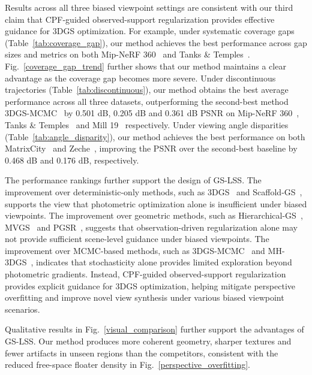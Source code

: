 \documentclass[lettersize,journal]{IEEEtran}
\begin{document}
Results across all three biased viewpoint settings are consistent with our third claim that CPF-guided observed-support regularization provides effective guidance for 3DGS optimization.
For example, under systematic coverage gaps (Table~\ref{tab:coverage_gap}), our method achieves the best performance across gap sizes and metrics on both Mip-NeRF 360~\cite{mipnerf360} and Tanks \& Temples~\cite{tankstemples}.
Fig.~\ref{coverage_gap_trend} further shows that our method maintains a clear advantage as the coverage gap becomes more severe. 
Under discontinuous trajectories (Table~\ref{tab:discontinuous}), 
our method obtains the best average performance across all three datasets, 
outperforming the second-best method 3DGS-MCMC~\cite{mcmc} by 0.501 dB, 0.205 dB and 0.361 dB PSNR on Mip-NeRF 360~\cite{mipnerf360}, Tanks \& Temples~\cite{tankstemples} and Mill 19~\cite{meganerf} respectively.
Under viewing angle disparities (Table~\ref{tab:angle_disparity}), our method achieves the best performance on both MatrixCity~\cite{matrixcity} and Zeche~\cite{isprs}, improving the PSNR over the second-best baseline by 0.468 dB and 0.176 dB, respectively.

The performance rankings further support the design of GS-LSS. The improvement over deterministic-only methods, such as 3DGS~\cite{3dgs} and Scaffold-GS~\cite{scaffold}, supports the view that photometric optimization alone is insufficient under biased viewpoints.
The improvement over geometric methods, such as Hierarchical-GS~\cite{hierarchical}, MVGS~\cite{mvgs} and PGSR~\cite{pgsr}, 
suggests that observation-driven regularization alone may not provide sufficient scene-level guidance under biased viewpoints. 
The improvement over MCMC-based methods, such as 3DGS-MCMC~\cite{mcmc} and MH-3DGS~\cite{mh3dgs}, indicates that
stochasticity alone provides limited exploration beyond photometric gradients. 
Instead, CPF-guided observed-support regularization provides explicit guidance for 3DGS optimization, helping mitigate perspective overfitting and improve novel view synthesis under various biased viewpoint scenarios. 

Qualitative results in Fig.~\ref{visual_comparison} further support the advantages of GS-LSS. Our method produces more coherent geometry, sharper textures and fewer artifacts in unseen regions than the competitors, consistent with the reduced free-space floater density in Fig.~\ref{perspective_overfitting}. 


\end{document}
